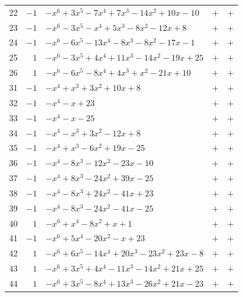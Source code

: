 \documentclass[11pt]{article}
\begin{document}
\begin{longtable}{@{}rrlcc@{}}
22 & $-1$ & $-x^{6}+3x^{5}-7x^{4}+7x^{3}-14x^{2}+10x-10$ & $+$ & $+$\\
23 & $-1$ & $-x^{6}-3x^{5}-x^{4}+5x^{3}-8x^{2}-12x+8$ & $+$ & $+$\\
24 & $-1$ & $-x^{6}-6x^{5}-13x^{4}-8x^{3}-8x^{2}-17x-1$ & $+$ & $+$\\
25 & $1$ & $-x^{6}-3x^{5}+4x^{4}+11x^{3}-14x^{2}-19x+25$ & $+$ & $+$\\
26 & $1$ & $-x^{6}-6x^{5}-8x^{4}+4x^{3}+x^{2}-21x+10$ & $+$ & $+$\\
31 & $-1$ & $-x^{4}+x^{3}+3x^{2}+10x+8$ & $+$ & $+$\\
32 & $-1$ & $-x^{4}-x+23$ & $+$ & $+$\\
33 & $-1$ & $-x^{4}-x-25$ & $+$ & $+$\\
34 & $-1$ & $-x^{4}-x^{3}+3x^{2}-12x+8$ & $+$ & $+$\\
35 & $-1$ & $-x^{4}+x^{3}-6x^{2}+19x-25$ & $+$ & $+$\\
36 & $-1$ & $-x^{4}-8x^{3}-12x^{2}-23x-10$ & $+$ & $+$\\
37 & $-1$ & $-x^{4}+8x^{3}-24x^{2}+39x-25$ & $+$ & $+$\\
38 & $-1$ & $-x^{4}-8x^{3}+24x^{2}-41x+23$ & $+$ & $+$\\
39 & $-1$ & $-x^{4}-8x^{3}-24x^{2}-41x-25$ & $+$ & $+$\\
40 & $1$ & $-x^{6}+x^{4}-8x^{2}+x+1$ & $+$ & $+$\\
41 & $-1$ & $-x^{6}+5x^{4}-20x^{2}-x+23$ & $+$ & $+$\\
42 & $1$ & $-x^{6}+6x^{5}-14x^{4}+20x^{3}-23x^{2}+23x-8$ & $+$ & $+$\\
43 & $1$ & $-x^{6}+3x^{5}+4x^{4}-11x^{3}-14x^{2}+21x+25$ & $+$ & $+$\\
44 & $1$ & $-x^{6}+3x^{5}-8x^{4}+13x^{3}-26x^{2}+21x-23$ & $+$ & $+$\\
\end{longtable}
\endgroup
\end{document}
